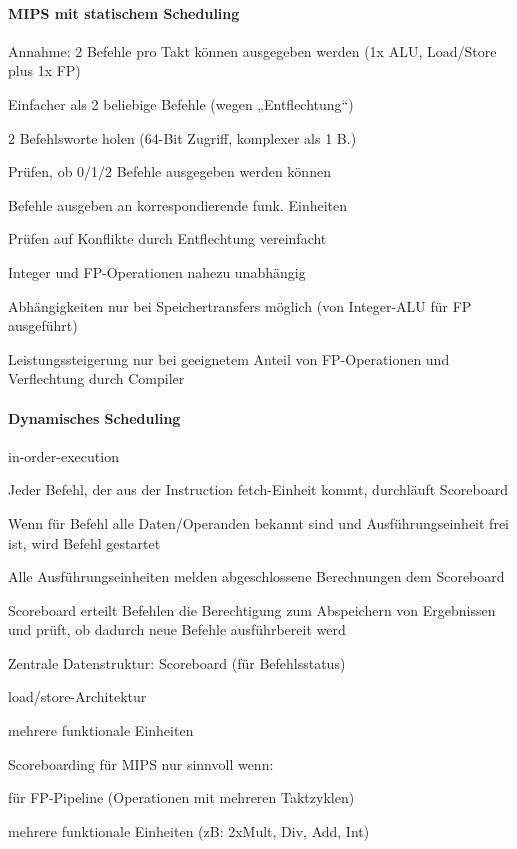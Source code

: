 \documentclass[a4paper]{article}
\begin{document}
\begin{multicols}{3}
  \paragraph{MIPS mit statischem Scheduling}
  \begin{itemize*}
    \item Annahme: 2 Befehle pro Takt können ausgegeben werden (1x ALU, Load/Store plus 1x FP)
    \item Einfacher als 2 beliebige Befehle (wegen „Entflechtung“)
    \item 2 Befehlsworte holen (64-Bit Zugriff, komplexer als 1 B.)
    \item Prüfen, ob 0/1/2 Befehle ausgegeben werden können
    \item Befehle ausgeben an korrespondierende funk. Einheiten
    \item Prüfen auf Konflikte durch Entflechtung vereinfacht
    \item Integer und FP-Operationen nahezu unabhängig
    \item Abhängigkeiten nur bei Speichertransfers möglich (von Integer-ALU für FP ausgeführt)
    \item Leistungssteigerung nur bei geeignetem Anteil von FP-Operationen und Verflechtung durch Compiler
  \end{itemize*}
  
  \paragraph{Dynamisches Scheduling} in-order-execution
  \begin{itemize*}
    \item Jeder Befehl, der aus der Instruction fetch-Einheit kommt, durchläuft Scoreboard
    \item Wenn für Befehl alle Daten/Operanden bekannt sind und Ausführungseinheit frei ist, wird Befehl gestartet
    \item Alle Ausführungseinheiten melden abgeschlossene Berechnungen dem Scoreboard
    \item Scoreboard erteilt Befehlen die Berechtigung zum Abspeichern von Ergebnissen und prüft, ob dadurch neue Befehle ausführbereit werd
    \item Zentrale Datenstruktur: Scoreboard (für Befehlsstatus)
    \item load/store-Architektur
    \item mehrere funktionale Einheiten
    \item Scoreboarding für MIPS nur sinnvoll wenn:
    \item für FP-Pipeline (Operationen mit mehreren Taktzyklen)
    \item mehrere funktionale Einheiten (zB: 2xMult, Div, Add, Int)
  \end{itemize*}
  

\end{multicols}
\end{document}
